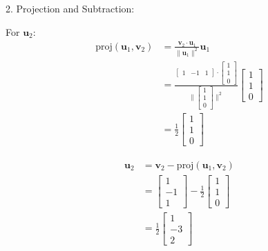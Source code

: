 2. Projection and Subtraction:

   For $\mathbf{u}_2$:
   \[
   \begin{aligned}
   \text{proj}(\mathbf{u}_1, \mathbf{v}_2) &= \frac{\mathbf{v}_2 \cdot \mathbf{u}_1}{\|\mathbf{u}_1\|^2} \mathbf{u}_1 \\
   &= \frac{\begin{bmatrix} 1 & -1 & 1 \end{bmatrix} \cdot \begin{bmatrix} 1 \\ 1 \\ 0 \end{bmatrix}}{\|\begin{bmatrix} 1 \\ 1 \\ 0 \end{bmatrix}\|^2} \begin{bmatrix} 1 \\ 1 \\ 0 \end{bmatrix} \\
   &= \frac{1}{2} \begin{bmatrix} 1 \\ 1 \\ 0 \end{bmatrix}
   \end{aligned}
   \]

   \[
   \begin{aligned}
   \mathbf{u}_2 &= \mathbf{v}_2 - \text{proj}(\mathbf{u}_1, \mathbf{v}_2) \\
   &= \begin{bmatrix} 1 \\ -1 \\ 1 \end{bmatrix} - \frac{1}{2} \begin{bmatrix} 1 \\ 1 \\ 0 \end{bmatrix} \\
   &= \frac{1}{2} \begin{bmatrix} 1 \\ -3 \\ 2 \end{bmatrix}
   \end{aligned}
   \]

